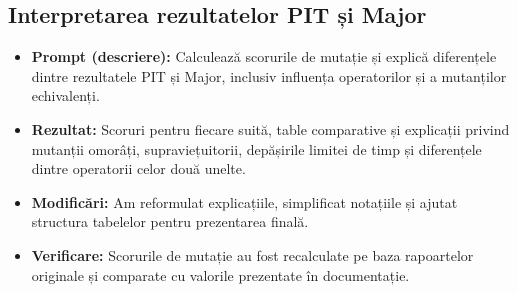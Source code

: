 \documentclass[11pt,a4paper]{article}
\begin{document}
\subsection{Interpretarea rezultatelor PIT și Major}
\begin{itemize}[label=\textendash]
\item \textbf{Prompt (descriere):} Calculează scorurile de mutație și explică diferențele dintre rezultatele PIT și Major, inclusiv influența operatorilor și a mutanților echivalenți.
\item \textbf{Rezultat:} Scoruri pentru fiecare suită, table comparative și explicații privind mutanții omorâți, supraviețuitorii, depășirile limitei de timp și diferențele dintre operatorii celor două unelte.
\item \textbf{Modificări:} Am reformulat explicațiile, simplificat notațiile și ajutat structura tabelelor pentru prezentarea finală.
\item \textbf{Verificare:} Scorurile de mutație au fost recalculate pe baza rapoartelor originale și comparate cu valorile prezentate în documentație.
\end{itemize}
\end{document}
